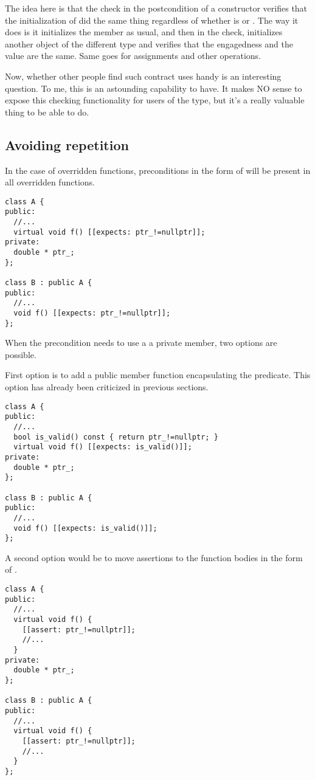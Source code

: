The idea here is that the check in the postcondition of a constructor verifies
that the initialization of  did the same thing regardless of whether
 is  or . The way it does is it
initializes the member as usual, and then in the check, initializes another
object of the different type and verifies that the engagedness and the value
are the same. Same goes for assignments and other operations.

Now, whether other people find such contract uses handy is an interesting
question. To me, this is an astounding capability to have. It makes NO sense to
expose this checking functionality for users of the type, but it's a really
valuable thing to be able to do.


\subsection{Avoiding repetition}

In the case of overridden functions, preconditions in the form of
\cppid{[[}\cppid{]]} will be present in all overridden
functions. 

\begin{lstlisting}
class A {
public:
  //...
  virtual void f() [[expects: ptr_!=nullptr]];
private:
  double * ptr_;
};

class B : public A {
public:
  //...
  void f() [[expects: ptr_!=nullptr]];
};
\end{lstlisting}

When the precondition needs to use a a private member, two options are
possible.

First option is to add a public member function encapsulating the predicate.
This option has already been criticized in previous sections.

\begin{lstlisting}
class A {
public:
  //...
  bool is_valid() const { return ptr_!=nullptr; }
  virtual void f() [[expects: is_valid()]];
private:
  double * ptr_;
};

class B : public A {
public:
  //...
  void f() [[expects: is_valid()]];
};
\end{lstlisting}

A second option would be to move assertions to the function bodies in the form
of .

\begin{lstlisting}
class A {
public:
  //...
  virtual void f() {
    [[assert: ptr_!=nullptr]];
    //...
  }
private:
  double * ptr_;
};

class B : public A {
public:
  //...
  virtual void f() {
    [[assert: ptr_!=nullptr]];
    //...
  }
};
\end{lstlisting}

